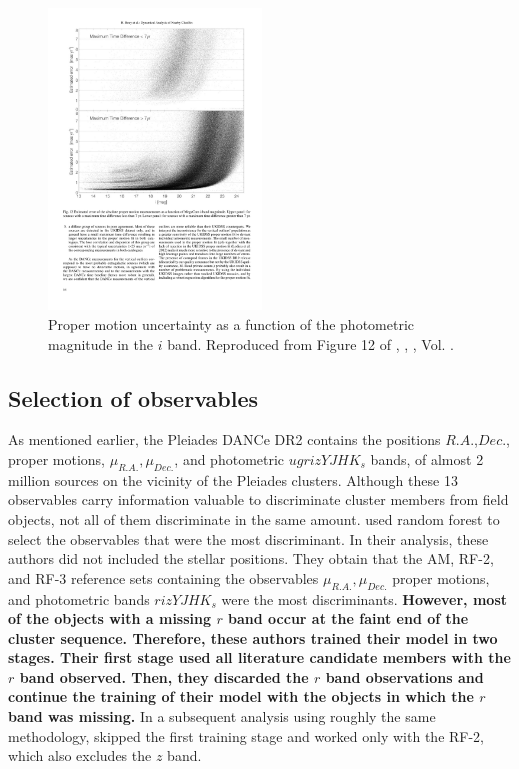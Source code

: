 \begin{figure}[ht!]
\begin{center}
\includegraphics[height=8cm]{background/Figures/F12_Bouy2013.pdf}
\caption{Proper motion uncertainty as a function of the photometric magnitude in the $i$ band. Reproduced from Figure 12 of \citet{Bouy2013}, \textit{}, , Vol. .}
\label{fig:pmuncert}
\end{center}
\end{figure}

\subsection{Selection of observables}
\label{sect:RF-2}
\sloppy
As mentioned earlier, the Pleiades DANCe DR2 contains the positions $R.A.$,$Dec.$, proper motions, $\mu_{R.A.},\mu_{Dec.}$, and photometric $ugrizYJHK_s$ bands, of almost 2 million sources on the vicinity of the Pleiades clusters. Although these 13 observables carry information valuable to discriminate cluster members from field objects, not all of them discriminate in the same amount. \citet{Sarro2014} used random forest to select the observables that were the most discriminant. In their analysis, these authors did not included the stellar positions. They obtain that the AM, RF-2, and RF-3 reference sets containing the observables $\mu_{R.A.},\mu_{Dec.}$ proper motions, and photometric bands $rizYJHK_s$ were the most discriminants. \textbf{However, most of the objects with a missing $r$ band occur at the faint end of the cluster sequence. Therefore, these authors trained their model in two stages. Their first stage used all literature candidate members with the $r$ band observed. Then, they discarded the $r$ band observations and continue the training of their model with the objects in which the $r$ band was missing.} In a subsequent analysis using roughly the same methodology, \citet{Bouy2015} skipped the first training stage and worked only with the RF-2, which also excludes the $z$ band.


